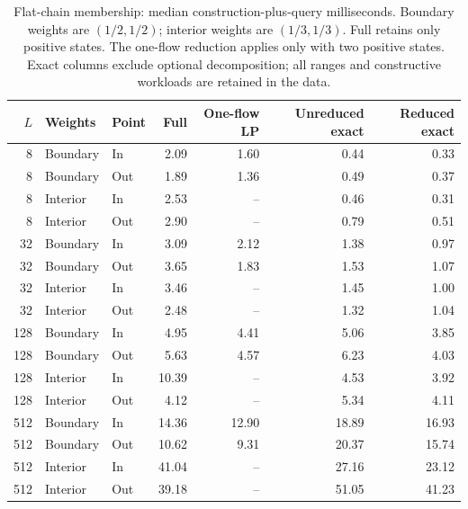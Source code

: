 \begin{table}[tb]\centering\small
\caption{Flat-chain membership: median construction-plus-query milliseconds. Boundary weights are $(1/2,1/2)$; interior weights are $(1/3,1/3)$. Full retains only positive states. The one-flow reduction applies only with two positive states. Exact columns exclude optional decomposition; all ranges and constructive workloads are retained in the data.}
\label{tab:computation-flat}
\begin{tabular}{rllrrrr}\toprule
$L$ & Weights & Point & Full & One-flow LP & Unreduced exact & Reduced exact\\\midrule
8 & Boundary & In & 2.09 & 1.60 & 0.44 & 0.33 \\
8 & Boundary & Out & 1.89 & 1.36 & 0.49 & 0.37 \\
8 & Interior & In & 2.53 & -- & 0.46 & 0.31 \\
8 & Interior & Out & 2.90 & -- & 0.79 & 0.51 \\
32 & Boundary & In & 3.09 & 2.12 & 1.38 & 0.97 \\
32 & Boundary & Out & 3.65 & 1.83 & 1.53 & 1.07 \\
32 & Interior & In & 3.46 & -- & 1.45 & 1.00 \\
32 & Interior & Out & 2.48 & -- & 1.32 & 1.04 \\
128 & Boundary & In & 4.95 & 4.41 & 5.06 & 3.85 \\
128 & Boundary & Out & 5.63 & 4.57 & 6.23 & 4.03 \\
128 & Interior & In & 10.39 & -- & 4.53 & 3.92 \\
128 & Interior & Out & 4.12 & -- & 5.34 & 4.11 \\
512 & Boundary & In & 14.36 & 12.90 & 18.89 & 16.93 \\
512 & Boundary & Out & 10.62 & 9.31 & 20.37 & 15.74 \\
512 & Interior & In & 41.04 & -- & 27.16 & 23.12 \\
512 & Interior & Out & 39.18 & -- & 51.05 & 41.23 \\
\bottomrule\end{tabular}\end{table}
